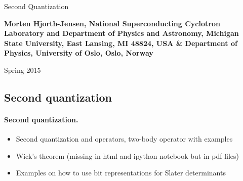 \documentclass[%
twoside,                 %
final,                   %
10pt]{article}
\begin{document}




\thispagestyle{empty}

\begin{center}
{\LARGE\bf
\begin{spacing}{1.25}
Second Quantization
\end{spacing}
}
\end{center}


\begin{center}
{\bf Morten Hjorth-Jensen, National Superconducting Cyclotron Laboratory and Department of Physics and Astronomy, Michigan State University, East Lansing, MI 48824, USA {\&} Department of Physics, University of Oslo, Oslo, Norway${}^{}$} \\ [0mm]
\end{center}

    \begin{center}
\end{center}
    

\begin{center} %
Spring 2015
\end{center}

\vspace{1cm}


\subsection*{Second quantization}


\paragraph{Second quantization.}
\begin{itemize}
\item Second quantization and operators, two-body operator with examples 

\item Wick's theorem (missing in html and ipython notebook but in pdf files)

\item Examples on how to use bit representations for Slater determinants
\end{itemize}
\end{document}
